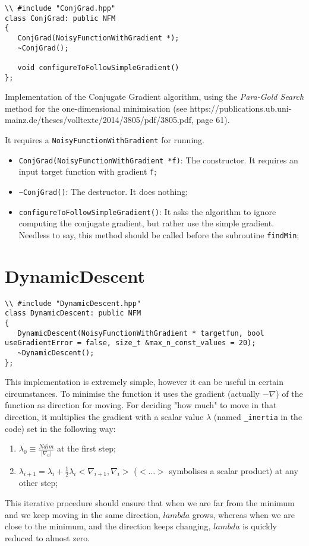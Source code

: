 \documentclass[11pt,a4paper,twoside]{article}
\begin{document}
\begin{lstlisting}
\\ #include "ConjGrad.hpp"
class ConjGrad: public NFM
{
   ConjGrad(NoisyFunctionWithGradient *);
   ~ConjGrad();

   void configureToFollowSimpleGradient()
};
\end{lstlisting}

Implementation of the Conjugate Gradient algorithm, using the \emph{Para-Gold Search} method for the one-dimensional minimisation (see https://publications.ub.uni-mainz.de/theses/volltexte/2014/3805/pdf/3805.pdf, page 61).

It requires a \verb+NoisyFunctionWithGradient+ for running.

\begin{itemize}
\item \verb+ConjGrad(NoisyFunctionWithGradient *f)+: The constructor. It requires an input target function with gradient \verb+f+;
\item \verb+~ConjGrad()+: The destructor. It does nothing;
\item \verb+configureToFollowSimpleGradient()+: It asks the algorithm to ignore computing the conjugate gradient, but rather use the simple gradient. Needless to say, this method should be called before the subroutine \verb+findMin+;
\end{itemize}





\section{DynamicDescent} %
\label{sec:dynamicdescent}

\begin{lstlisting}
\\ #include "DynamicDescent.hpp"
class DynamicDescent: public NFM
{
   DynamicDescent(NoisyFunctionWithGradient * targetfun, bool useGradientError = false, size_t &max_n_const_values = 20);
   ~DynamicDescent();
};
\end{lstlisting}

This implementation is extremely simple, however it can be useful in certain circumstances. To minimise the function it uses the gradient (actually $-\nabla$) of the function as direction for moving. For deciding "how much" to move in that direction, it multiplies the gradient with a scalar value $\lambda$ (named \verb+_inertia+ in the code) set in the following way:
\begin{enumerate}
\item $\lambda_0 \equiv \frac{Ndim}{\left| \nabla_0 \right|}$ at the first step;
\item $\lambda_{i+1} = \lambda_i + \frac{1}{2} \lambda_i <\nabla_{i+1}, \nabla_i>$ ($< \dots >$ symbolises a scalar product) at any other step;
\end{enumerate}
This iterative procedure should ensure that when we are far from the minimum and we keep moving in the same direction, $lambda$ grows, whereas when we are close to the minimum, and the direction keeps changing, $lambda$ is quickly reduced to almost zero.
\end{document}
